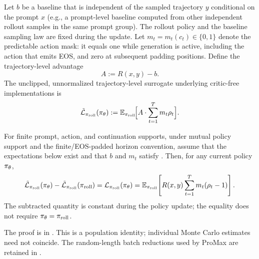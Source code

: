 \begin{definition}
\label{def:impl-surrogate}
Let $b$ be a baseline that is independent of the sampled trajectory $y$ conditional on the prompt $x$ (e.g., a prompt-level baseline
computed from other independent rollout samples in the same prompt group). The rollout policy and the baseline sampling law are fixed
during the update. Let $m_t=m_t(c_t)\in\{0,1\}$ denote the predictable action mask: it equals one while generation is active, including
the action that emits EOS, and zero at subsequent padding positions. Define the trajectory-level advantage
\begin{equation*}
    A := R(x, y) - b.
\end{equation*}
The unclipped, unnormalized trajectory-level surrogate underlying critic-free implementations is
\begin{equation*}
    \tilde{\mathcal{L}}_{\pi_{\mathrm{roll}}}(\pi_{\theta}) := \mathbb{E}_{\pi_{\mathrm{roll}}}\!\Big[A \cdot \sum_{t=1}^T m_t\rho_t\Big].
\end{equation*}
\end{definition}

\begin{proposition}
\label{prop:surrogate-equivalence}
For finite prompt, action, and continuation supports, under mutual policy support and the finite/EOS-padded horizon convention, assume that the expectations below exist and that $b$ and
$m_t$ satisfy . Then, for any current policy $\pi_{\theta}$,
\begin{equation}
    \tilde{\mathcal L}_{\pi_{\mathrm{roll}}}(\pi_{\theta})
    -\tilde{\mathcal L}_{\pi_{\mathrm{roll}}}(\pi_{\mathrm{roll}})
    =\mathcal L_{\pi_{\mathrm{roll}}}(\pi_{\theta})
    =\mathbb{E}_{\pi_{\mathrm{roll}}}\!\left[R(x,y)\sum_{t=1}^{T}m_t(\rho_t-1)\right].
    \label{eq:surrogate-equivalence}
\end{equation}
The subtracted quantity is constant during the policy update; the equality does not require $\pi_{\theta}=\pi_{\mathrm{roll}}$.
\end{proposition}

The proof is in . This is a population
identity; individual Monte Carlo estimates need not coincide. The random-length
batch reductions used by ProMax are retained in .

